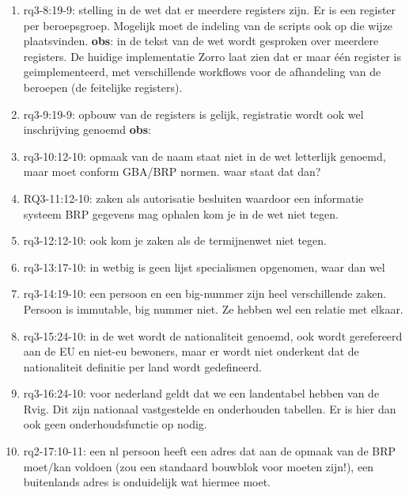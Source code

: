 \begin{enumerate}
    \item rq3-8:19-9: stelling in de wet dat er meerdere registers zijn. 
    Er is een register per beroepsgroep. 
    Mogelijk moet de indeling van de scripts ook op die wijze plaatsvinden.
    \newline\textbf{obs}: in de tekst van de wet wordt gesproken over meerdere registers. 
    De huidige implementatie Zorro laat zien dat er maar één register is geimplementeerd, met verschillende workflows voor de afhandeling van de beroepen (de feitelijke registers).
    
    \item rq3-9:19-9: opbouw van de registers is gelijk, registratie wordt ook wel inschrijving genoemd
    \newline\textbf{obs}: 
    
    \item rq3-10:12-10: opmaak van de naam staat niet in de wet letterlijk genoemd, maar moet conform GBA/BRP normen. waar staat dat dan?
    \item RQ3-11:12-10: zaken als autorisatie besluiten waardoor een informatie systeem BRP gegevens mag ophalen kom je in de wet niet tegen.
    \item rq3-12:12-10: ook kom je zaken als de termijnenwet niet tegen. 
    \item rq3-13:17-10: in wetbig is geen lijst specialismen opgenomen, waar dan wel
    \item rq3-14:19-10: een persoon en een big-nummer zijn heel verschillende zaken. Persoon is immutable, big nummer niet. Ze hebben wel een relatie met elkaar.
    \item rq3-15:24-10: in de wet wordt de nationaliteit genoemd, ook wordt gerefereerd aan de EU en niet-eu bewoners, maar er wordt niet onderkent dat de nationaliteit definitie per land wordt gedefineerd.
    \item rq3-16:24-10: voor nederland geldt dat we een landentabel hebben van de Rvig. Dit zijn nationaal vastgestelde en onderhouden tabellen. Er is hier dan ook geen onderhoudsfunctie op nodig.
    \item rq2-17:10-11: een nl persoon heeft een adres dat aan de opmaak van de BRP moet/kan voldoen (zou een standaard bouwblok voor moeten zijn!), een buitenlands adres is onduidelijk wat hiermee moet.    
\end{enumerate}